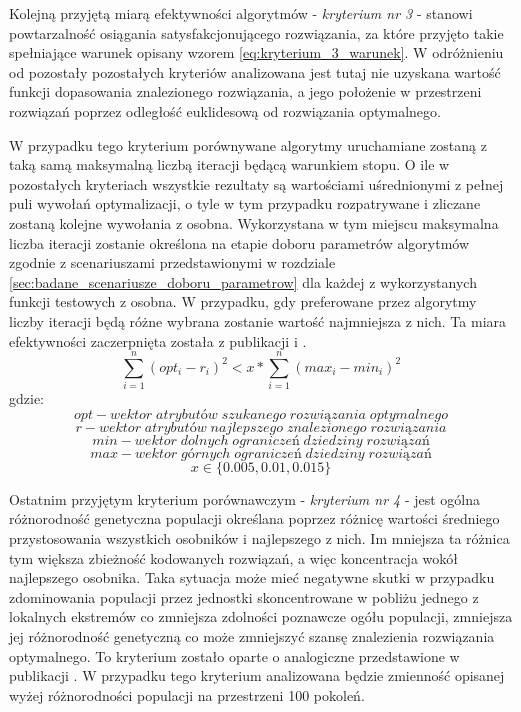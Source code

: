 \par 
Kolejną przyjętą miarą efektywności algorytmów - \emph{kryterium nr 3} - stanowi powtarzalność osiągania satysfakcjonującego rozwiązania, za które przyjęto takie spełniające warunek opisany wzorem \ref{eq:kryterium_3_warunek}. W odróżnieniu od pozostały pozostałych kryteriów analizowana jest tutaj nie uzyskana wartość funkcji dopasowania znalezionego rozwiązania, a jego położenie w przestrzeni rozwiązań poprzez odległość euklidesową od rozwiązania optymalnego.
\par 
W przypadku tego kryterium porównywane algorytmy uruchamiane zostaną z taką samą maksymalną liczbą iteracji będącą warunkiem stopu. O ile w pozostałych kryteriach wszystkie rezultaty są wartościami uśrednionymi z pełnej puli wywołań optymalizacji, o tyle w tym przypadku rozpatrywane i zliczane zostaną kolejne wywołania z osobna. Wykorzystana w tym miejscu maksymalna liczba iteracji zostanie określona na etapie doboru parametrów algorytmów zgodnie z scenariuszami przedstawionymi w rozdziale \ref{sec:badane_scenariusze_doboru_parametrow} dla każdej z wykorzystanych funkcji testowych z osobna. W przypadku, gdy preferowane przez algorytmy liczby iteracji będą różne wybrana zostanie wartość najmniejsza z nich. Ta miara efektywności zaczerpnięta została z publikacji \cite{elbeltagi2005comparison} i \cite{mullen2014continuous}. 
\begin{equation} \label{eq:kryterium_3_warunek}
\sum_{i=1}^{n}\left(opt_i-r_i\right)^2 < x*\sum_{i=1}^{n}\left(max_i-min_i\right)^2
\end{equation}
gdzie:
\[opt - wektor\; atrybutów\; szukanego\; rozwiązania\; optymalnego\]
\[r - wektor\; atrybutów\; najlepszego\; znalezionego\; rozwiązania\]
\[min - wektor\; dolnych\; ograniczeń\; dziedziny\; rozwiązań\]
\[max - wektor\; górnych\; ograniczeń\; dziedziny\; rozwiązań\]
\[x \in \lbrace0.005, 0.01, 0.015\rbrace\]

\par 
Ostatnim przyjętym kryterium porównawczym - \emph{kryterium nr 4} - jest ogólna różnorodność genetyczna populacji określana poprzez różnicę wartości średniego przystosowania wszystkich osobników i najlepszego z nich. Im mniejsza ta różnica tym większa zbieżność kodowanych rozwiązań, a więc koncentracja wokół najlepszego osobnika. Taka sytuacja może mieć negatywne skutki w przypadku zdominowania populacji przez jednostki skoncentrowane w pobliżu jednego z lokalnych ekstremów co zmniejsza zdolności poznawcze ogółu populacji, zmniejsza jej różnorodność genetyczną co może zmniejszyć szansę znalezienia rozwiązania optymalnego. To kryterium zostało oparte o analogiczne przedstawione w publikacji \cite{ong2006classification}. W przypadku tego kryterium analizowana będzie zmienność opisanej wyżej różnorodności populacji na przestrzeni 100 pokoleń.



